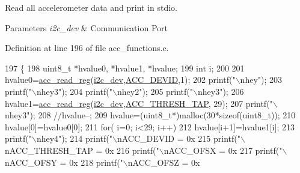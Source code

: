 Read all accelerometer data and print in stdio. 


\begin{DoxyParams}{Parameters}
{\em i2c\-\_\-dev} & Communication Port \\
\hline
\end{DoxyParams}


Definition at line 196 of file acc\-\_\-functions.\-c.


\begin{DoxyCode}
197 \{
198   uint8\_t *hvalue0, *hvalue1, *hvalue;
199   \textcolor{keywordtype}{int} i;
200   
201   hvalue0=\hyperlink{group__acc_ga2a91c44eebbe44f4d3b8c508633512f9}{acc\_read\_reg}(\hyperlink{CommunicationV0_2communication_8c_a7751bd45ac1064efb35adf1f19c25db8}{i2c\_dev},\hyperlink{communication_2imu__regs_8h_a007fa8d8ef9d89127ae5da32a2f42283}{ACC\_DEVID},1);
202   printf(\textcolor{stringliteral}{"\(\backslash\)nhey"});
203   printf(\textcolor{stringliteral}{"\(\backslash\)nhey3"});
204   printf(\textcolor{stringliteral}{"\(\backslash\)nhey2"});
205   printf(\textcolor{stringliteral}{"\(\backslash\)nhey3"});
206   hvalue1=\hyperlink{group__acc_ga2a91c44eebbe44f4d3b8c508633512f9}{acc\_read\_reg}(\hyperlink{CommunicationV0_2communication_8c_a7751bd45ac1064efb35adf1f19c25db8}{i2c\_dev},\hyperlink{communication_2imu__regs_8h_afa5af181c4af31e22baa9bd20ff322ef}{ACC\_THRESH\_TAP}, 29);
207   printf(\textcolor{stringliteral}{"\(\backslash\)nhey3"});
208   \textcolor{comment}{//hvalue--;}
209   hvalue=(uint8\_t*)malloc(30*\textcolor{keyword}{sizeof}(uint8\_t));
210   hvalue[0]=hvalue0[0];
211   \textcolor{keywordflow}{for}( i=0; i<29; i++)
212     hvalue[i+1]=hvalue1[i];
213   printf(\textcolor{stringliteral}{"\(\backslash\)nhey4"});
214   printf(\textcolor{stringliteral}{"\(\backslash\)nACC\_DEVID = 0x%
215   printf(\textcolor{stringliteral}{"\(\backslash\)nACC\_THRESH\_TAP = 0x%
216   printf(\textcolor{stringliteral}{"\(\backslash\)nACC\_OFSX = 0x%
217   printf(\textcolor{stringliteral}{"\(\backslash\)nACC\_OFSY = 0x%
218   printf(\textcolor{stringliteral}{"\(\backslash\)nACC\_OFSZ = 0x%
}}}}}
\end{DoxyCode}

